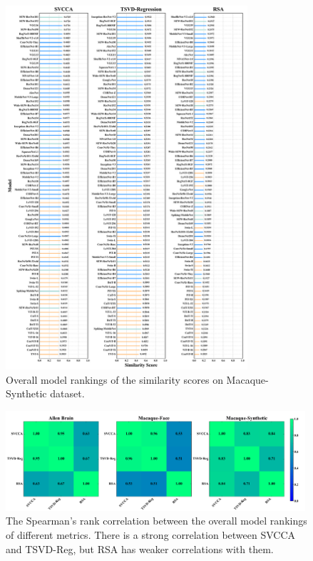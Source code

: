 \documentclass[letterpaper]{article} %
\begin{document}
\begin{figure}[t]
	\centering
	\includegraphics[width=0.80\textwidth]{figs/model_rank_macaque_synthetic_color.pdf}
	\caption{Overall model rankings of the similarity scores on Macaque-Synthetic dataset.}
	\label{Fig.model_rank_macaque_synthetic}
\end{figure}

\begin{figure}[t]
	\centering
	\includegraphics[width=0.99\textwidth]{figs/rank_order_metrics.pdf}
	\caption{The Spearman's rank correlation between the overall model rankings of different metrics. There is a strong correlation between SVCCA and TSVD-Reg, but RSA has weaker correlations with them.}
	\label{Fig.rank_order}
\end{figure}
\end{document}
